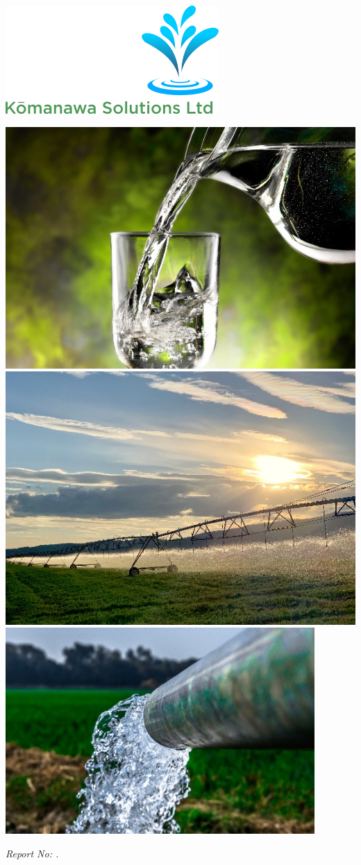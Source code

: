 
\begin{titlepage}
    \begin{center}
        \begin{tcolorbox}[colback=black!80!white,colframe=black!80!white,
            valign=center]
            \includegraphics[width=.40\textwidth]{figures/template_figs/KSL_white_transparent}\\
            \begin{center}
                \includegraphics[height=0.225\textwidth]{figures/template_figs/title_img_1}
                \includegraphics[height=0.225\textwidth]{figures/template_figs/title_img_2}
                \includegraphics[height=0.225\textwidth]{figures/template_figs/title_img_3}
            \end{center}

        \end{tcolorbox}

        \vspace*{1.5cm}

        \center
        \begin{tcolorbox}[colback=kslvlblue,colframe=ksldarkblue,
            width=0.90\textwidth, valign=center]
            \color{ksldarkblue}
            \textit{Report No: \projcode{}.\nthreport}


\end{tcolorbox}
\end{center}
\end{titlepage}

